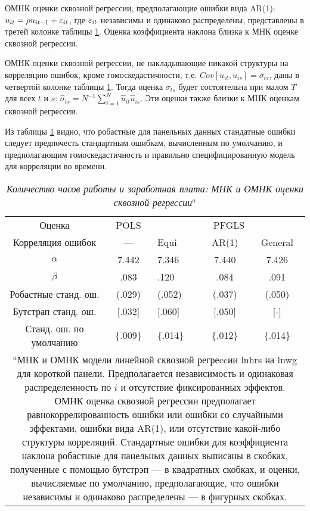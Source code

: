 ОМНК оценки сквозной регрессии, предполагающие ошибки вида AR(1): $u_{it}=\rho u_{it-1}+\varepsilon_{it}$, где $\varepsilon_{it}$ независимы и одинаково распределены, представлены в третей колонке таблицы \ref{Tab:21.7}. Оценка коэффициента наклона близка к МНК оценке сквозной регрессии.

ОМНК оценки сквозной регрессии, не накладывающие никакой структуры на корреляцию ошибок, кроме гомоскедастичности, т.е. $Cov[u_{it}, u_{is}]=\sigma_{ts}$, даны в четвертой колонке таблицы \ref{Tab:21.7}. Тогда оценка $\sigma_{ts}$ будет состоятельна при малом $T$ для всех $t$ и $s$: $\hat{\sigma}_{ts}=N^{-1}\sum^N_{i=1}\hat{u}_{it}\hat{u}_{is}$. Эти оценки также близки к МНК оценкам сквозной регрессии.

Из таблицы \ref{Tab:21.7} видно, что робастные для панельных данных стандатные ошибки следует предпочесть стандартным ошибкам, вычисленным по умолчанию, и предполагающим гомоскедастичность и правильно специфицированную модель для корреляции во времени.


 \begin{table}[ht]
\caption{{\it Количество часов работы и заработная плата: МНК и ОМНК оценки сквозной регрессии$^a$}} 
\centering
\begin{tabular}{cc p{2cm} cc}
\hline \hline
	Оценка & POLS & \multicolumn{3}{c}{PFGLS}\\
 Корреляция ошибок & --- & Equi & AR(1) & General\\
\hline
$\alpha$ & 7.442 & 7.346 & 7.440 & 7.426\\
$\beta$	& .083	& .120 	&.084 & .091 \\
Робастные станд. ош.		& (.029) &(.052) & (.037) & (.050) \\
Бутстрап станд. ош.			& [.032] & [.060] & [.050] &[-] \\
Станд. ош. по умолчанию	& \{.009\} & \{.014\}& \{.012\}  & \{.014\} \\
\hline \hline
\multicolumn{5}{p{14cm}}{$^a$МНК и ОМНК модели линейной сквозной регреccии lnhrs на lnwg для короткой панели. Предполагается независимость и одинаковая распределенность по $i$ и отсутствие фиксированных эффектов.  ОМНК оценка сквозной регрессии предполагает равнокоррелированность  ошибки или ошибки со случайными эффектами, ошибки вида AR(1), или отсутствие какой-либо структуры корреляций. Стандартные ошибки для коэффициента наклона робастные для панельных данных выписаны в скобках, полученные с помощью бутстрэп --- в квадратных скобках, и оценки, вычисляемые по умолчанию, предполагающие, что ошибки независимы и одинаково распределены --- в фигурных скобках.} \\
\end{tabular}
\label{Tab:21.7}
\end{table}

